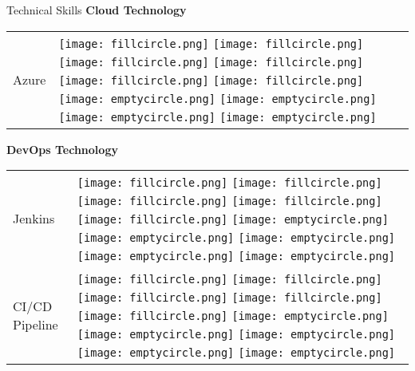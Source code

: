 \documentclass{resume}
\begin{document}
\begin{rSection}{Technical Skills}
{\bf Cloud Technology }
\begin{table}[h!]
  \begin{tabular}{p{10cm}p{6cm}}
  Azure & 
  \texttt{[image: fillcircle.png]} 
  \texttt{[image: fillcircle.png]} 
  \texttt{[image: fillcircle.png]}
  \texttt{[image: fillcircle.png]} 
  \texttt{[image: fillcircle.png]}
  \texttt{[image: fillcircle.png]} 
  \texttt{[image: emptycircle.png]}
  \texttt{[image: emptycircle.png]} 
  \texttt{[image: emptycircle.png]} 
  \texttt{[image: emptycircle.png]} \\
  \end{tabular}
\end{table}

{\bf DevOps Technology }
\begin{table}[h!]
  \begin{tabular}{p{10cm}p{6cm}}
  Jenkins & 
  \texttt{[image: fillcircle.png]} 
  \texttt{[image: fillcircle.png]} 
  \texttt{[image: fillcircle.png]}
  \texttt{[image: fillcircle.png]} 
  \texttt{[image: fillcircle.png]}
  \texttt{[image: emptycircle.png]} 
  \texttt{[image: emptycircle.png]}
  \texttt{[image: emptycircle.png]} 
  \texttt{[image: emptycircle.png]} 
  \texttt{[image: emptycircle.png]} \\  
  CI/CD Pipeline & 
  \texttt{[image: fillcircle.png]} 
  \texttt{[image: fillcircle.png]} 
  \texttt{[image: fillcircle.png]}
  \texttt{[image: fillcircle.png]} 
  \texttt{[image: fillcircle.png]}
  \texttt{[image: emptycircle.png]} 
  \texttt{[image: emptycircle.png]}
  \texttt{[image: emptycircle.png]} 
  \texttt{[image: emptycircle.png]} 
  \texttt{[image: emptycircle.png]} \\
  \end{tabular}
\end{table}


\end{rSection}
\end{document}
